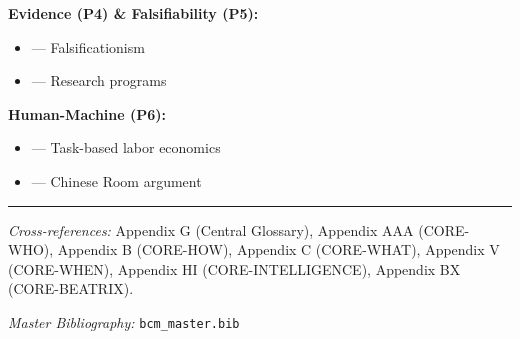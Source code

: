 \textbf{Evidence (P4) \& Falsifiability (P5):}
\begin{itemize}[nosep]
    \item \citet{popper1959logic} --- Falsificationism
    \item \citet{lakatos1978methodology} --- Research programs
\end{itemize}

\textbf{Human-Machine (P6):}
\begin{itemize}[nosep]
    \item \citet{autor2003skill} --- Task-based labor economics
    \item \citet{searle1980minds} --- Chinese Room argument
\end{itemize}

\nocite{bcm_master}



\vspace{1em}
\hrule
\vspace{0.5em}

\noindent\textit{Cross-references:}
Appendix G (Central Glossary),
Appendix AAA (CORE-WHO),
Appendix B (CORE-HOW),
Appendix C (CORE-WHAT),
Appendix V (CORE-WHEN),
Appendix HI (CORE-INTELLIGENCE),
Appendix BX (CORE-BEATRIX).

\noindent\textit{Master Bibliography:} \texttt{bcm\_master.bib}


